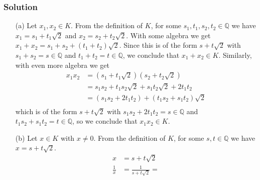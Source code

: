 \documentclass[12pt]{article}
\begin{document}
\subsubsection*{Solution}
\begin{itemize}
\item[(a)] Let $x_1, x_2 \in K$. From the definition of $K$, for some $s_1, t_1, s_2, t_2 \in \mathbb{Q}$ we have $x_1 = s_1 + t_1 \sqrt{2}$ and $x_2 = s_2 + t_2\sqrt{2}$. With some algebra we get $x_1 + x_2 = s_1 + s_2 + \left(t_1 + t_2\right)\sqrt{2}$. Since this is of the form $s + t\sqrt{2}$ with $s_1 + s_2 = s \in \mathbb{Q}$ and $t_1 + t_2 = t \in \mathbb{Q}$, we conclude that $x_1 + x_2 \in K$. Similarly, with even more algebra we get
\begin{align*}
x_1x_2 &= \left(s_1 + t_1\sqrt{2}\right) \left(s_2 + t_2\sqrt{2}\right) \\
&= s_1s_2 + t_1s_2\sqrt{2} + s_1t_2\sqrt{2} + 2t_1t_2 \\
&= \left(s_1s_2 + 2t_1t_2\right) + \left(t_1s_2 + s_1t_2\right)\sqrt{2} \\
\end{align*}
which is of the form $s + t \sqrt{2}$ with $s_1s_2 + 2t_1t_2 = s \in \mathbb{Q}$ and $t_1s_2 + s_1t_2 = t \in \mathbb{Q}$, so we conclude that $x_1x_2 \in K$.
\item[(b)] Let $x \in K$ with $x \neq 0$. From the definition of $K$, for some $s, t \in \mathbb{Q}$ we have $x = s + t\sqrt{2}$.
\begin{align*}
x &= s + t\sqrt{2} \\
\frac{1}{x} &= \frac{1}{s + t\sqrt{2}} = \\ 
\end{align*}
\end{itemize}
\end{document}
